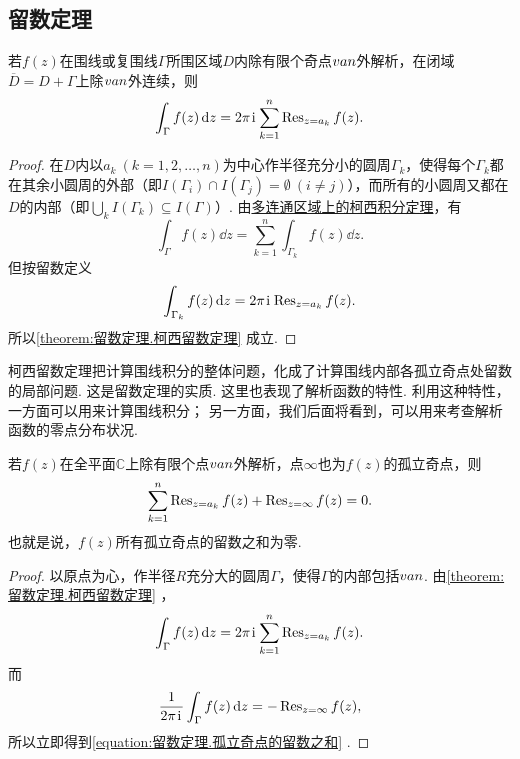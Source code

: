 \subsection{留数定理}
\begin{theorem}[柯西留数定理]\label{theorem:留数定理.柯西留数定理}
若\(f(z)\)在围线或复围线\(\Gamma\)所围区域\(D\)内除有限个奇点\(v{a}{n}\)外解析，在闭域\(\overline{D}=D+\Gamma\)上除\(v{a}{n}\)外连续，则\begin{equation}\label{equation:留数定理.柯西留数定理}
\int_{\Gamma} f(z) \dd{z}
= 2\pi\kern1pt\mathrm{i}\kern1pt \sum\limits_{k=1}^n \operatorname{Res}_{z=a_k} f(z).
\end{equation}
\begin{proof}
在\(D\)内以\(a_k\ (k=1,2,\dotsc,n)\)为中心作半径充分小的圆周\(\Gamma_k\)，使得每个\(\Gamma_k\)都在其余小圆周的外部（即\(I(\Gamma_i) \cap I(\Gamma_j) = \emptyset\ (i \neq j)\)），而所有的小圆周又都在\(D\)的内部（即\(\bigcup_k I(\Gamma_k) \subseteq I(\Gamma)\)）.
由\hyperref[theorem:解析函数的积分表示.多连通区域的柯西积分定理]{多连通区域上的柯西积分定理}，有\[
\int_{\Gamma} f(z) \dd{z}
= \sum\limits_{k=1}^n \int_{\Gamma_k} f(z) \dd{z}.
\]但按留数定义\[
\int_{\Gamma_k} f(z) \dd{z} = 2\pi\kern1pt\mathrm{i}\kern1pt \operatorname{Res}_{z=a_k} f(z).
\]所以\cref{theorem:留数定理.柯西留数定理} 成立.
\end{proof}
\end{theorem}
柯西留数定理把计算围线积分的整体问题，化成了计算围线内部各孤立奇点处留数的局部问题.
这是留数定理的实质.
这里也表现了解析函数的特性.
利用这种特性，一方面可以用来计算围线积分；
另一方面，我们后面将看到，可以用来考查解析函数的零点分布状况.

\begin{theorem}\label{theorem:留数定理.孤立奇点的留数之和}
若\(f(z)\)在全平面\(\mathbb{C}\)上除有限个点\(v{a}{n}\)外解析，点\(\infty\)也为\(f(z)\)的孤立奇点，则\begin{equation}\label{equation:留数定理.孤立奇点的留数之和}
\sum\limits_{k=1}^n \operatorname{Res}_{z=a_k} f(z) + \operatorname{Res}_{z=\infty} f(z) = 0.
\end{equation}也就是说，\(f(z)\)所有孤立奇点的留数之和为零.
\begin{proof}
以原点为心，作半径\(R\)充分大的圆周\(\Gamma\)，使得\(\Gamma\)的内部包括\(v{a}{n}\).
由\cref{theorem:留数定理.柯西留数定理} ，\[
\int_{\Gamma} f(z) \dd{z}
= 2\pi\kern1pt\mathrm{i}\kern1pt \sum\limits_{k=1}^n \operatorname{Res}_{z=a_k} f(z).
\]而\[
\frac{1}{2\pi\kern1pt\mathrm{i}\kern1pt} \int_{\Gamma} f(z) \dd{z}
= -\operatorname{Res}_{z=\infty} f(z),
\]所以立即得到\cref{equation:留数定理.孤立奇点的留数之和} .
\end{proof}
\end{theorem}

